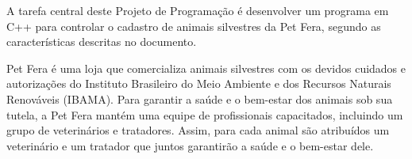 A tarefa central deste Projeto de Programação é desenvolver um programa em C++ para controlar o cadastro de animais silvestres da Pet Fera, segundo as características descritas no documento.

Pet Fera é uma loja que comercializa animais silvestres com os devidos cuidados e autorizações do Instituto Brasileiro do Meio Ambiente e dos Recursos Naturais Renováveis (I\+B\+A\+MA). Para garantir a saúde e o bem-\/estar dos animais sob sua tutela, a Pet Fera mantém uma equipe de profissionais capacitados, incluindo um grupo de veterinários e tratadores. Assim, para cada animal são atribuídos um veterinário e um tratador que juntos garantirão a saúde e o bem-\/estar dele. 